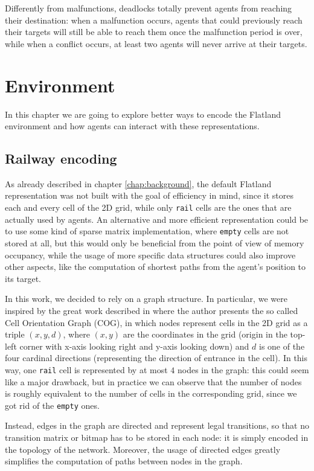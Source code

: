 \documentclass[a4paper,10pt]{report}
\begin{document}
Differently from malfunctions, deadlocks totally prevent agents from reaching their destination: when a malfunction occurs, agents that could previously reach their targets will still be able to reach them once the malfunction period is over, while when a conflict occurs, at least two agents will never arrive at their targets.

\chapter{Environment}
In this chapter we are going to explore better ways to encode the Flatland environment and how agents can interact with these representations.

\section{Railway encoding}\label{sec:railway-encoding}
As already described in chapter \ref{chap:background}, the default Flatland representation was not built with the goal of efficiency in mind, since it stores each and every cell of the 2D grid, while only \texttt{rail} cells are the ones that are actually used by agents. An alternative and more efficient representation could be to use some kind of sparse matrix implementation, where \texttt{empty} cells are not stored at all, but this would only be beneficial from the point of view of memory occupancy, while the usage of more specific data structures could also improve other aspects, like the computation of shortest paths from the agent's position to its target.

In this work, we decided to rely on a graph structure. In particular, we were inspired by the great work described in \cite{jonas} where the author presents the so called Cell Orientation Graph (COG), in which nodes represent cells in the 2D grid as a triple $(x, y, d)$, where $(x, y)$ are the coordinates in the grid (origin in the top-left corner with x-axis looking right and y-axis looking down) and $d$ is one of the four cardinal directions (representing the direction of entrance in the cell). In this way, one \texttt{rail} cell is represented by at most $4$ nodes in the graph: this could seem like a major drawback, but in practice we can observe that the number of nodes is roughly equivalent to the number of cells in the corresponding grid, since we got rid of the \texttt{empty} ones.

Instead, edges in the graph are directed and represent legal transitions, so that no transition matrix or bitmap has to be stored in each node: it is simply encoded in the topology of the network. Moreover, the usage of directed edges greatly simplifies the computation of paths between nodes in the graph.
\end{document}
